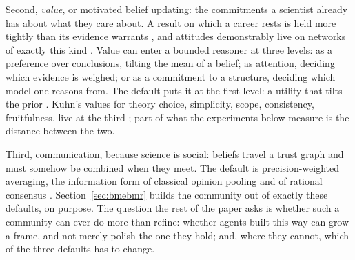 Second, \emph{value}, or motivated belief updating: the commitments a scientist already has
about what they care about. A result on which a career rests is held more tightly than its
evidence warrants \citep{kitcher1990,strevens2003}, and attitudes demonstrably live on
networks of exactly this kind \citep{dalege2016}. Value can enter a bounded reasoner at three
levels: as a preference over conclusions, tilting the mean of a belief; as attention,
deciding which evidence is weighed; or as a commitment to a structure, deciding which model
one reasons from. The default puts it at the first level: a utility that tilts the prior
\citep{hyland2025}. Kuhn's values for theory choice, simplicity, scope, consistency,
fruitfulness, live at the third \citep{kuhn1977}; part of what the experiments below
measure is the distance between the two.

Third, communication, because science is social: beliefs travel a trust graph and must
somehow be combined when they meet. The default is precision-weighted averaging, the
information form of classical opinion pooling and of rational consensus
\citep{degroot1974,genest1986,lehrer1981}. Section~\ref{sec:bmebmr} builds the community
out of exactly these defaults, on purpose. The question the rest of the paper asks is
whether such a community can ever do more than refine: whether agents built this way can
grow a frame, and not merely polish the one they hold; and, where they cannot, which of the
three defaults has to change.

%
%
